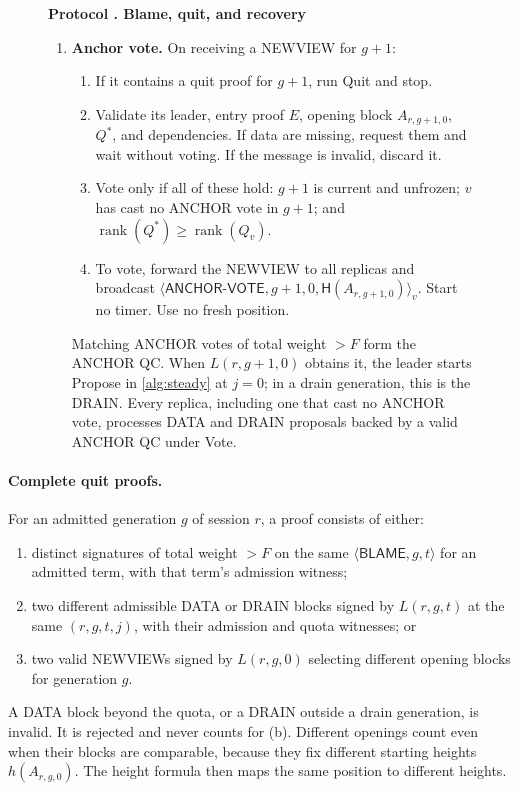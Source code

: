 \documentclass[11pt,a4paper]{article}
\newcommand{\RR}[1]{{\color{rrRed}#1}}
\newcommand{\Hash}{\mathsf H}
\newcommand{\rank}{\operatorname{rank}}
\newcommand{\tagg}[1]{\ensuremath{\mathsf{#1}}}
\newcounter{protocol}
\newenvironment{protocol}[2]{\begin{figure}[htbp]\refstepcounter{protocol}\label{#1}
\begin{mdframed}[linewidth=.6pt,skipabove=0pt,skipbelow=0pt,
innertopmargin=7pt,innerbottommargin=7pt]\small
\textbf{Protocol \theprotocol. #2}\par\smallskip}{\end{mdframed}\end{figure}}
\begin{document}
\begin{protocol}{alg:recovery}{Blame, quit, and recovery}
\begin{enumerate}[label=\textbf{\arabic*)},itemsep=3pt]
\item \textbf{Anchor vote.} On receiving a NEWVIEW for $g+1$:
 \begin{enumerate}[label=(\alph*)]
 \item If it contains a quit proof for $g+1$, run Quit and stop.
 \item Validate its leader, entry proof $E$, opening block $A_{r,g+1,0}$,
       $Q^*$, and dependencies. If data are missing, request them and
       wait without voting. If the message is invalid, discard it.
 \item Vote only if all of these hold: $g+1$ is current and unfrozen; $v$
       has cast no ANCHOR vote in $g+1$; and $\rank(Q^*)\ge\rank(Q_v)$.
 \item To vote, forward the NEWVIEW to all replicas and broadcast
       $\langle\tagg{ANCHOR\mbox{-}VOTE},g+1,0,\Hash(A_{r,g+1,0})\rangle_v$.
       Start no timer. Use no fresh position.
 \end{enumerate}
 Matching ANCHOR votes \RR{of total weight $>F$} form the ANCHOR QC.
 When $L(r,g+1,0)$ obtains it, the leader starts Propose in
 \cref{alg:steady} at $j=0$\RR{; in a drain generation, this is the
 DRAIN}. Every replica, including one that cast no ANCHOR vote,
 processes DATA \RR{and DRAIN} proposals backed by a valid ANCHOR QC
 under Vote.
\end{enumerate}
\end{protocol}

\paragraph{Complete quit proofs.}
For an admitted generation $g$ \RR{of session $r$}, a proof consists of
either:
\begin{enumerate}[label=(\alph*)]
\item distinct signatures \RR{of total weight $>F$} on the same
$\langle\tagg{BLAME},g,t\rangle$ for an admitted term, with that term's
admission witness;
\item two different admissible DATA \RR{or DRAIN} blocks signed by
$L(r,g,t)$ at the same $(r,g,t,j)$, with their admission \RR{and quota}
witnesses; or
\item two valid NEWVIEWs signed by $L(r,g,0)$ selecting different opening
blocks for generation $g$.
\end{enumerate}
\RR{A DATA block beyond the quota, or a DRAIN outside a drain generation,
is invalid. It is rejected and never counts for (b).}
Different openings count even when their blocks are comparable, because
they fix different starting heights $h(A_{r,g,0})$. The height formula then
maps the same position to different heights.
\end{document}
